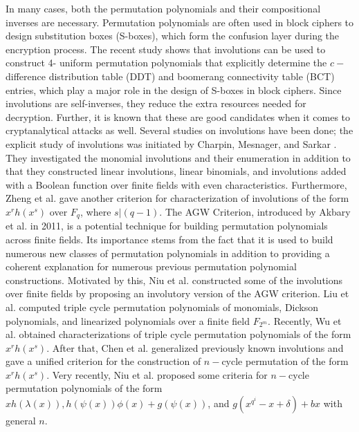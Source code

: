 \documentclass[12pt,a4paper]{article}
\begin{document}
In many cases, both the permutation polynomials and their compositional inverses are necessary. Permutation polynomials are often used in block ciphers to design substitution boxes (S-boxes), which form the confusion layer during the encryption process. The recent study \cite{hasan2021c} shows that involutions can be used to construct 4- uniform permutation polynomials that explicitly determine the $ c-$difference distribution table (DDT)  and boomerang connectivity table (BCT) entries, which play a major role in the design of S-boxes in block ciphers. Since involutions are self-inverses, they reduce the extra resources needed for decryption. Further, it is known that these are good candidates when it comes to cryptanalytical attacks as well. Several studies on involutions have been done; the explicit study of involutions was initiated by Charpin, Mesnager, and Sarkar \cite{charpin2016involutions,mesnager2016constructions,charpin2015involutions,charpin2016dickson}. They investigated the monomial involutions and their enumeration in addition to that they constructed linear involutions, linear binomials, and involutions added with a Boolean function over finite fields with even characteristics. Furthermore,  Zheng et al. \cite{zheng2019constructions} gave another criterion for characterization of involutions of the form $ x^{r}h(x^{s}) $ over $ F_{q} $, where $ s|(q-1) $. The AGW Criterion, introduced by Akbary et al. \cite{akbary2011constructing} in 2011, is a potential technique for building permutation polynomials across finite fields. Its importance stems from the fact that it is used to build numerous new classes of permutation polynomials in addition to providing a coherent explanation for numerous previous permutation polynomial constructions. Motivated by this, 
 Niu et al. \cite{niu2020new}  constructed some of the involutions over finite fields by proposing an involutory version of the AGW criterion. Liu et al. \cite{liu2019triple}  computed triple cycle permutation polynomials of monomials, Dickson polynomials, and linearized polynomials over a finite field $ F_{2^{m}} $. Recently,  Wu et al. \cite{wu2020characterizations} obtained characterizations of triple cycle permutation polynomials of the form $ x^{r}h(x^{s}) $. After that, Chen et al.  \cite{chen2021constructions} generalized previously known involutions and gave a unified criterion for the construction of  $ n-$cycle permutation of the form $ x^{r}h(x^{s}) $.  Very recently, Niu et al.  \cite{niu2023more} proposed some criteria for $ n-$cycle permutation polynomials of the form $ xh(\lambda(x)),h(\psi(x))\phi(x)+g(\psi(x))$, and $g(x^{q^{i}}-x+\delta)+bx $ with general $ n $. 
\end{document}

